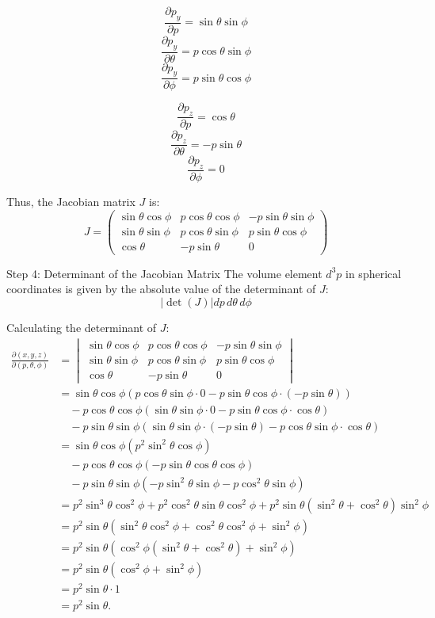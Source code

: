 \[ \frac{\partial p_y}{\partial p} = \sin\theta \sin\phi \]
\[ \frac{\partial p_y}{\partial \theta} = p \cos\theta \sin\phi \]
\[ \frac{\partial p_y}{\partial \phi} = p \sin\theta \cos\phi \]

\[ \frac{\partial p_z}{\partial p} = \cos\theta \]
\[ \frac{\partial p_z}{\partial \theta} = -p \sin\theta \]
\[ \frac{\partial p_z}{\partial \phi} = 0 \]

Thus, the Jacobian matrix \(J\) is:
\[ J = \begin{pmatrix}
\sin\theta \cos\phi & p \cos\theta \cos\phi & -p \sin\theta \sin\phi \\
\sin\theta \sin\phi & p \cos\theta \sin\phi & p \sin\theta \cos\phi \\
\cos\theta & -p \sin\theta & 0
\end{pmatrix} \]

Step 4: Determinant of the Jacobian Matrix
The volume element \(d^3p\) in spherical coordinates is given by the absolute value of the determinant of \(J\):
\[ \left| \det(J) \right| dp \, d\theta \, d\phi \]

Calculating the determinant of \(J\):
\begin{align*}
    \frac{\partial (x, y, z)}{\partial (p, \theta, \phi)} &=
    \begin{vmatrix}
    \sin\theta \cos\phi & p \cos\theta \cos\phi & -p \sin\theta \sin\phi \\
    \sin\theta \sin\phi & p \cos\theta \sin\phi & p \sin\theta \cos\phi \\
    \cos\theta & -p \sin\theta & 0
    \end{vmatrix} \\
    &= \sin\theta \cos\phi \left( p \cos\theta \sin\phi \cdot 0 - p \sin\theta \cos\phi \cdot (-p \sin\theta) \right) \\
    &\quad - p \cos\theta \cos\phi \left( \sin\theta \sin\phi \cdot 0 - p \sin\theta \cos\phi \cdot \cos\theta \right) \\
    &\quad - p \sin\theta \sin\phi \left( \sin\theta \sin\phi \cdot (-p \sin\theta) - p \cos\theta \sin\phi \cdot \cos\theta \right) \\
    &= \sin\theta \cos\phi \left( p^2 \sin^2\theta \cos\phi \right) \\
    &\quad - p \cos\theta \cos\phi \left( -p \sin\theta \cos\theta \cos\phi \right) \\
    &\quad - p \sin\theta \sin\phi \left( -p \sin^2\theta \sin\phi - p \cos^2\theta \sin\phi \right) \\
    &= p^2 \sin^3\theta \cos^2\phi + p^2 \cos^2\theta \sin\theta \cos^2\phi + p^2 \sin\theta \left( \sin^2\theta + \cos^2\theta \right) \sin^2\phi \\
    &= p^2 \sin\theta \left( \sin^2\theta \cos^2\phi + \cos^2\theta \cos^2\phi + \sin^2\phi \right) \\
    &= p^2 \sin\theta \left( \cos^2\phi (\sin^2\theta + \cos^2\theta) + \sin^2\phi \right) \\
    &= p^2 \sin\theta \left( \cos^2\phi + \sin^2\phi \right) \\
    &= p^2 \sin\theta \cdot 1 \\
    &= p^2 \sin\theta.
    \end{align*}

